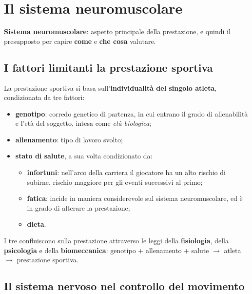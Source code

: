 \chapter{Il sistema neuromuscolare}
\label{cap:neuromuscolare}

\textbf{Sistema neuromuscolare}: aspetto principale della prestazione, e quindi il presupposto
per capire \textbf{come} e \textbf{che cosa} valutare.

\section{I fattori limitanti la prestazione sportiva}

La prestazione sportiva si basa sull'\textbf{individualità del singolo atleta}, condizionata da
tre fattori:
\begin{itemize}
  \item \textbf{genotipo}: corredo genetico di partenza, in cui entrano il grado di
    allenabilità e l'età del soggetto, intesa come \textit{età biologica};
  \item \textbf{allenamento}: tipo di lavoro svolto;
  \item \textbf{stato di salute}, a sua volta condizionato da:
    \begin{itemize}
      \item \textbf{infortuni}: nell'arco della carriera il giocatore ha un alto rischio di
        subirne, rischio maggiore per gli eventi successivi al primo;
      \item \textbf{fatica}: incide in maniera considerevole sul sistema neuromuscolare, ed è
        in grado di alterare la prestazione;
      \item \textbf{dieta}.
    \end{itemize}
\end{itemize}

I tre confluiscono sulla prestazione attraverso le leggi della \textbf{fisiologia}, della
\textbf{psicologia} e della \textbf{biomeccanica}: genotipo + allenamento + salute
$\rightarrow$ atleta $\rightarrow$ prestazione sportiva.

\section{Il sistema nervoso nel controllo del movimento}

